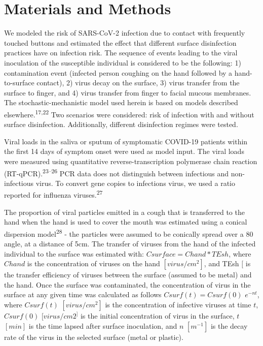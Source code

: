 \documentclass[journal=jacsat,manuscript=article]{achemso}
\begin{document}
\hypertarget{materials-and-methods}{%
\section{Materials and Methods}\label{materials-and-methods}}

We modeled the risk of SARS-CoV-2 infection due to contact with
frequently touched buttons and estimated the effect that different
surface disinfection practices have on infection risk. The sequence of
events leading to the viral inoculation of the susceptible individual is
considered to be the following: 1) contamination event (infected person
coughing on the hand followed by a hand-to-surface contact), 2) virus
decay on the surface, 3) virus transfer from the surface to finger, and
4) virus transfer from finger to facial mucous membranes. The
stochastic-mechanistic model used herein is based on models described
elsewhere.\textsuperscript{17,22} Two scenarios were considered: risk of
infection with and without surface disinfection. Additionally, different
disinfection regimes were tested.

Viral loads in the saliva or sputum of symptomatic COVID-19 patients
within the first 14 days of symptom onset were used as model input. The
viral loads were measured using quantitative reverse-transcription
polymerase chain reaction (RT-qPCR).\textsuperscript{23--26} PCR data
does not distinguish between infectious and non-infectious virus. To
convert gene copies to infections virus, we used a ratio reported for
influenza viruses.\textsuperscript{27}

The proportion of viral particles emitted in a cough that is transferred
to the hand when the hand is used to cover the mouth was estimated using
a conical dispersion model\textsuperscript{28} - the particles were
assumed to be conically spread over a 80 angle, at a distance of 5cm.
The transfer of viruses from the hand of the infected individual to the
surface was estimated with: \(Csurface=Chand*TEsh\), where \(Chand\) is
the concentration of viruses on the hand \([virus/cm^2]\), and TEsh
\([%
\) is the transfer efficiency of viruses between the surface (assumed to
be metal) and the hand. Once the surface was contaminated, the
concentration of virus in the surface at any given time was calculated
as follows \(Csurf(t)= Csurf(0)\) \(e^{-nt}\), where \(Csurf(t)\)
\([virus/cm^2]\) is the concentration of infective viruses at time
\(t\), \(Csurf(0)\) \([virus/cm2^]\) is the initial concentration of
virus in the surface, \(t\) \([min]\) is the time lapsed after surface
inoculation, and \(n\) \([m^{-1}]\) is the decay rate of the virus in
the selected surface (metal or plastic).
\end{document}
